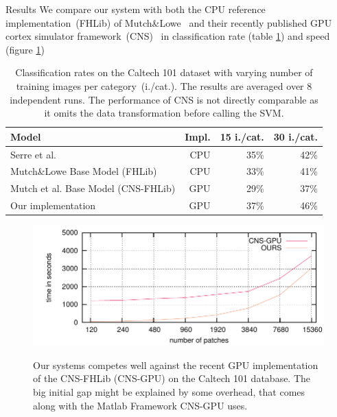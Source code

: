 \documentclass[final]{beamer}
\begin{document}
\begin{frame}{}
\begin{columns}[t]
\begin{column}{.48\linewidth}
        \begin{block}{Results}
We compare our system with both the CPU reference implementation~(FHLib) of Mutch\&Lowe~\cite{mutch06} and their
recently published GPU cortex simulator framework~(CNS)~\cite{mutch10} in classification rate (table \ref{table:caltech}) and speed (figure \ref{fig:performance})
\newline
\begin{table}[t]
  \begin{center}

    \label{table:caltech}
    \begin{tabular}{|l|r|r|r|}
     \hline
      Model & Impl. & 15 i./cat. & 30 i./cat.\\
      \hline
      Serre et al. \cite{serre05}                          & CPU & 35\% & 42\% \\ %
		 
      Mutch\&Lowe Base Model (FHLib) \cite{mutch06}      & CPU & 33\% & 41\%\\ %
      Mutch et al. Base Model  (CNS-FHLib) \cite{mutch10} & GPU & 29\%  & 37\%\\ %
      Our implementation                     & GPU & 37\% & 46\%\\
      \hline
    \end{tabular}
        \caption{ Classification rates on the Caltech 101 dataset
      with varying number of training images per category~(i./cat.). 
      The results are averaged over  8 independent runs.  The performance of CNS is not directly
      comparable as it omits the data transformation before calling the SVM.
    }
  \end{center}
\end{table}

\begin{figure}[htb]
  \centering
    \includegraphics[width=.8\linewidth]{images/PNumTime_max} \\
  \caption{ Our systems competes well against the recent GPU
    implementation of the CNS-FHLib (CNS-GPU) on the Caltech 101 database. 
    The big initial gap might be explained by some overhead, that comes along
    with the Matlab Framework CNS-GPU uses. }
  \label{fig:performance}
\end{figure}
        \end{block}
        

\end{column}
\end{columns}
\end{frame}
\end{document}

